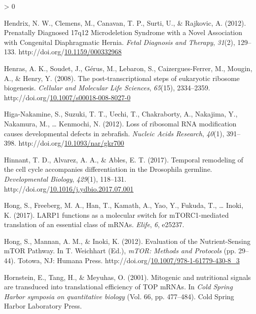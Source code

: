 \documentclass[12pt,oneside]{reedthesis}
\newlength{\cslhangindent}
\newenvironment{CSLReferences}[2] %
 {%
  \setlength{\parindent}{0pt}
  \ifodd #1 \everypar{\setlength{\hangindent}{\cslhangindent}}\ignorespaces\fi
  \ifnum #2 > 0
  \setlength{\parskip}{#2\baselineskip}
  \fi
 }%
 {}
\begin{document}
\begin{CSLReferences}{1}{0}
\leavevmode\hypertarget{ref-hendrixPrenatallyDiagnosed17q122012}{}%
Hendrix, N. W., Clemens, M., Canavan, T. P., Surti, U., \& Rajkovic, A. (2012). Prenatally {Diagnosed} 17q12 {Microdeletion Syndrome} with a {Novel Association} with {Congenital Diaphragmatic Hernia}. \emph{Fetal Diagnosis and Therapy}, \emph{31}(2), 129--133. http://doi.org/\href{https://doi.org/10.1159/000332968}{10.1159/000332968}

\leavevmode\hypertarget{ref-Henras2008c}{}%
Henras, A. K., Soudet, J., Gérus, M., Lebaron, S., Caizergues-Ferrer, M., Mougin, A., \& Henry, Y. (2008). The post-transcriptional steps of eukaryotic ribosome biogenesis. \emph{Cellular and Molecular Life Sciences}, \emph{65}(15), 2334--2359. http://doi.org/\href{https://doi.org/10.1007/s00018-008-8027-0}{10.1007/s00018-008-8027-0}

\leavevmode\hypertarget{ref-Higa-Nakamine2012o}{}%
Higa-Nakamine, S., Suzuki, T. T., Uechi, T., Chakraborty, A., Nakajima, Y., Nakamura, M., \ldots{} Kenmochi, N. (2012). Loss of ribosomal {RNA} modification causes developmental defects in zebrafish. \emph{Nucleic Acids Research}, \emph{40}(1), 391--398. http://doi.org/\href{https://doi.org/10.1093/nar/gkr700}{10.1093/nar/gkr700}

\leavevmode\hypertarget{ref-hinnantTemporalRemodelingCell2017}{}%
Hinnant, T. D., Alvarez, A. A., \& Ables, E. T. (2017). Temporal remodeling of the cell cycle accompanies differentiation in the {Drosophila} germline. \emph{Developmental Biology}, \emph{429}(1), 118--131. http://doi.org/\href{https://doi.org/10.1016/j.ydbio.2017.07.001}{10.1016/j.ydbio.2017.07.001}

\leavevmode\hypertarget{ref-Hong2017a}{}%
Hong, S., Freeberg, M. A., Han, T., Kamath, A., Yao, Y., Fukuda, T., \ldots{} Inoki, K. (2017). {LARP1} functions as a molecular switch for {mTORC1-mediated} translation of an essential class of {mRNAs}. \emph{Elife}, \emph{6}, e25237.

\leavevmode\hypertarget{ref-hongEvaluationNutrientSensingMTOR2012}{}%
Hong, S., Mannan, A. M., \& Inoki, K. (2012). Evaluation of the {Nutrient-Sensing mTOR Pathway}. In T. Weichhart (Ed.), \emph{{mTOR}: {Methods} and {Protocols}} (pp. 29--44). {Totowa, NJ}: {Humana Press}. http://doi.org/\href{https://doi.org/10.1007/978-1-61779-430-8_3}{10.1007/978-1-61779-430-8\_3}

\leavevmode\hypertarget{ref-Hornstein2001a}{}%
Hornstein, E., Tang, H., \& Meyuhas, O. (2001). Mitogenic and nutritional signals are transduced into translational efficiency of {TOP mRNAs}. In \emph{Cold {Spring Harbor} symposia on quantitative biology} (Vol. 66, pp. 477--484). {Cold Spring Harbor Laboratory Press}.


\end{CSLReferences}
\end{document}
